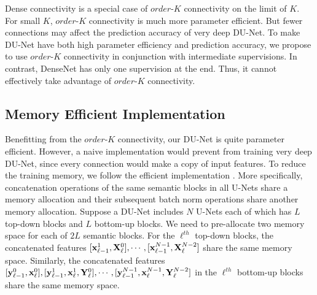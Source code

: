 Dense connectivity is a special case of $order$-$K$ connectivity on the limit of $K$. For small $K$, $order$-$K$ connectivity is much more parameter efficient. But fewer connections may affect the prediction accuracy of very deep DU-Net. To make DU-Net have both high parameter efficiency and prediction accuracy, we propose to use $order$-$K$ connectivity in conjunction with intermediate supervisions. In contrast, DenseNet \cite{huang2016densely} has only one supervision at the end. Thus, it cannot effectively take advantage of $order$-$K$ connectivity.


\subsection{Memory Efficient Implementation}
Benefitting from the $order$-$K$ connectivity, our DU-Net is quite parameter efficient. However, a naive implementation would prevent from training very deep DU-Net, since every connection would make a copy of input features. To reduce the training memory, we follow the efficient implementation \cite{pleiss2017memory}. More specifically, concatenation operations of the same semantic blocks in all U-Nets share a memory allocation and their subsequent batch norm operations share another memory allocation. Suppose a DU-Net includes $N$ U-Nets each of which has $L$ top-down blocks and $L$ bottom-up blocks. We need to pre-allocate two memory space for each of $2L$ semantic blocks. For the $\ell^{th}$ top-down blocks, the concatenated features $[{\bf x}_{\ell-1}^1, {\bf X}_\ell^0], \cdots, [{\bf x}_{\ell-1}^{N-1}, {\bf X}_\ell^{N-2}]$ share the same memory space. Similarly, the concatenated features $[{\bf y}_{\ell-1}^0,{\bf x}_\ell^0], [{\bf y}_{\ell-1}^1,{\bf x}_\ell^1,{\bf Y}_\ell^0], \cdots, [{\bf y}_{\ell-1}^{N-1},{\bf x}_\ell^{N-1},{\bf Y}_\ell^{N-2}]$ in the $\ell^{th}$ bottom-up blocks share the same memory space.

